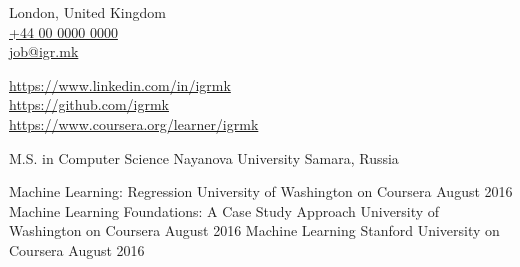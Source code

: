 \documentclass[9pt,a4paper]{juicv}
\newcommand{\myphone}{\href{tel:+440000000000}{+44 00 0000 0000}}
\begin{document}
\begin{paracol}{2}
\newpage
\switchcolumn

    London, United Kingdom\\
    \myphone\\
    \href{mailto:job@igr.mk}{job@igr.mk}

    \vspace{6pt}
    {
        \small
        \href{https://www.linkedin.com/in/igrmk}{https://www.linkedin.com/in/igrmk}\\
        \href{https://github.com/igrmk}{https://github.com/igrmk}\\
        \href{https://www.coursera.org/learner/igrmk}{https://www.coursera.org/learner/igrmk}
        \par
    }


    \vspace{6pt}
    {
        \raggedright
    }

    \cvRightEventNoBody
        {M.S. in Computer Science}
        {Nayanova University}
        {}
        {Samara, Russia}

    \cvRightEventNoBody
        {Machine Learning: Regression}
        {University of Washington on Coursera}
        {August 2016}
        {}
    \cvRightEventNoBody
        {Machine Learning Foundations: A Case Study Approach}
        {University of Washington on Coursera}
        {August 2016}
        {}
    \cvRightEventNoBody
        {Machine Learning}
        {Stanford University on Coursera}
        {August 2016}
        {}

\end{paracol}
\end{document}
